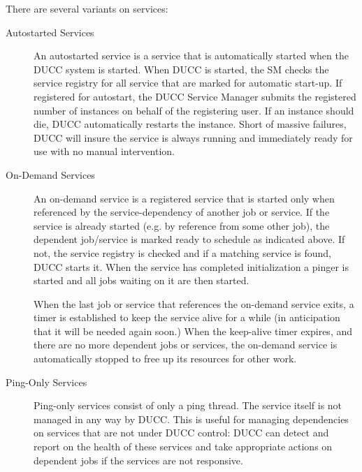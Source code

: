       There are several variants on services:
      \begin{description}

        \item[Autostarted Services] An autostarted service is a  service that is
          automatically started when the DUCC system is started. When DUCC is started, the SM checks the
          service registry for all service that are marked for automatic start-up.  If registered for autostart,
          the DUCC Service Manager submits the registered number of instances
          on behalf of the registering user.  If an instance should die, DUCC automatically restarts
          the instance.  Short of massive failures, DUCC will insure the service is always running
          and immediately ready for use with no manual intervention.
          
        \item[On-Demand Services] An on-demand service is a registered service that is started only
          when referenced by the service-dependency of another job or service. If the service is
          already started (e.g. by reference from some other job), the dependent job/service is
          marked ready to schedule as indicated above. If not, the service registry is checked and
          if a matching service is found, DUCC starts it. When the service has completed
          initialization a pinger is started and all jobs waiting on it are then started.
          
          When the last job or service that references the on-demand service exits, a timer is
          established to keep the service alive for a while (in anticipation that it will be needed
          again soon.)  When the keep-alive timer expires, and there are no more dependent
          jobs or services, the on-demand service is automatically stopped to free up its resources for
          other work.

        \item[Ping-Only Services] 
          \label{subsub:services.ping-only}
          Ping-only services consist of only
          a ping thread.  The service itself is not managed in any way by DUCC.  This is useful for
          managing dependencies on services that are not under DUCC control: DUCC can detect and
          report on the health of these services and take appropriate actions on dependent jobs if
          the services are not responsive.
      \end{description}
          

